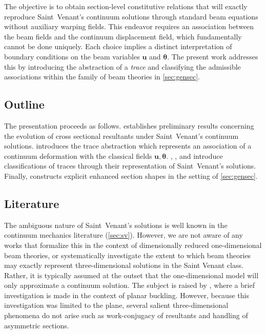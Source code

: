 The objective is to obtain section-level constitutive relations that will exactly reproduce Saint~Venant's continuum solutions through standard beam equations without auxiliary warping fields.
This endeavor requires an association between the beam fields and the continuum displacement field, which fundamentally cannot be done uniquely. Each choice implies a distinct interpretation of boundary conditions on the beam variables \(\bm{u}\) and \(\bm{\theta}\).
The present work addresses this by introducing the abstraction of a \emph{trace} and classifying the admissible associations within the family of beam theories in \cref{sec:gensec}.


\subsection{Outline}


The presentation proceeds as follows. 
 establishes preliminary results concerning the evolution of cross sectional resultants under Saint~Venant's continuum solutions. 
 introduces the trace abstraction which represents an association of a continuum deformation with the classical fields \(\bm{u},\bm{\theta}\). 
, , and  introduce classifications of traces through their representation of Saint~Venant's solutions. 
Finally,  constructs explicit enhanced section shapes in the setting of \cref{sec:gensec}.

%
\subsection{Literature}
The ambiguous nature of Saint~Venant's solutions is well known in the continuum mechanics literature (\cref{sec:sv}). 
However, we are not aware of any works that formalize this in the context of dimensionally reduced one-dimensional beam theories, or systematically investigate the extent to which beam theories may exactly represent three-dimensional solutions in the Saint Venant class. 
Rather, it is typically assumed at the outset that the one-dimensional model will only approximate a continuum solution. 
The subject is raised by \cite{simo1982bifurcation}, where a brief investigation is made in the context of planar buckling. 
However, because this investigation was limited to the plane, several salient three-dimensional phenomena do not arise such as work-conjugacy of resultants and handling of asymmetric sections. 

